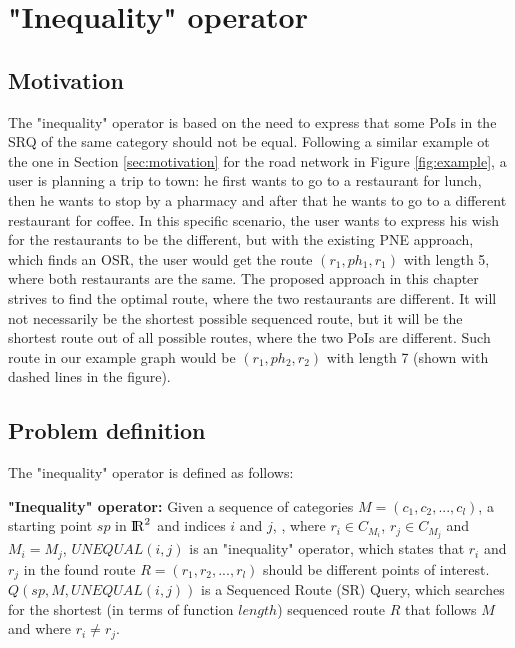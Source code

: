 


\section{"Inequality" operator}

\subsection{Motivation}
\label{sec:motNEO}
The "inequality" operator is based on the need to express that some PoIs in the SRQ of the same category should not be equal. Following a similar example ot the one in Section \ref{sec:motivation} for the road network in Figure \ref{fig:example}, a user is planning a trip to town: he first wants to go to a restaurant for lunch, then he wants to stop by a pharmacy and after that he wants to go to a different restaurant for coffee. In this specific scenario, the user wants to express his wish for the restaurants to be the different, but with the existing PNE \cite{OSR} approach, which finds an OSR, the user would get the route $(r_1, ph_1, r_1)$ with length 5, where both restaurants are the same. The proposed approach in this chapter strives to find the optimal route, where the two restaurants are different. It will not necessarily be the shortest possible sequenced route, but it will be the shortest route out of all possible routes, where the two PoIs are different. Such route in our example graph would be $(r_1, ph_2, r_2)$ with length 7 (shown with dashed lines in the figure).

\subsection{Problem definition} 
\label{sec:problemNEO}
The "inequality" operator is defined as follows:

\textbf{"Inequality" operator:} Given a sequence of categories $M = (c_1, c_2, ..., c_l)$, a starting point $sp$ in ${\rm I\!R}^2$ and indices $i$ and $j$, , where $r_i \in C_{M_{i}}$, $r_j \in C_{M_{j}}$ and $M_i = M_j$, $UNEQUAL(i, j)$ is an "inequality" operator, which states that $r_i$ and $r_j$ in the found route $R = (r_1, r_2, ..., r_l)$ should be different points of interest.
$Q(sp, M, UNEQUAL(i, j))$ is a Sequenced Route (SR) Query, which searches for the shortest (in terms of function $length$) sequenced route $R$ that follows $M$ and where $r_i \neq r_j$.

